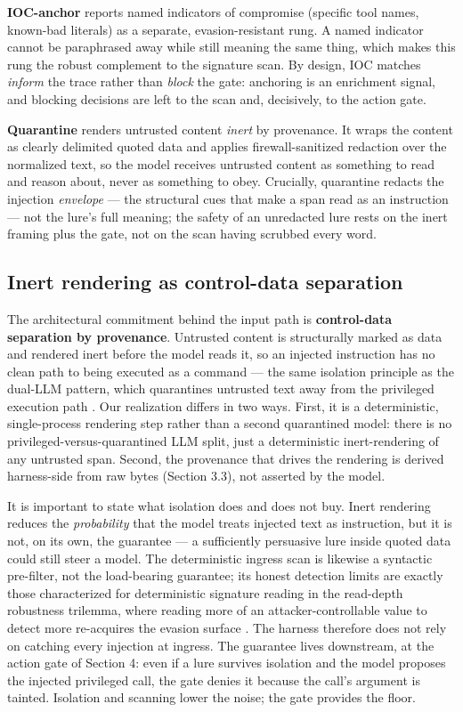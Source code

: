 \documentclass[sigconf,anonymous,review]{acmart}
\begin{document}
\textbf{IOC-anchor} reports named indicators of compromise (specific tool names, known-bad literals) as a separate, evasion-resistant rung. A named indicator cannot be paraphrased away while still meaning the same thing, which makes this rung the robust complement to the signature scan. By design, IOC matches \textit{inform} the trace rather than \textit{block} the gate: anchoring is an enrichment signal, and blocking decisions are left to the scan and, decisively, to the action gate.

\textbf{Quarantine} renders untrusted content \textit{inert} by provenance. It wraps the content as clearly delimited quoted data and applies firewall-sanitized redaction over the normalized text, so the model receives untrusted content as something to read and reason about, never as something to obey. Crucially, quarantine redacts the injection \textit{envelope} --- the structural cues that make a span read as an instruction --- not the lure's full meaning; the safety of an unredacted lure rests on the inert framing plus the gate, not on the scan having scrubbed every word.


\subsection{Inert rendering as control-data separation}
The architectural commitment behind the input path is \textbf{control-data separation by provenance}. Untrusted content is structurally marked as data and rendered inert before the model reads it, so an injected instruction has no clean path to being executed as a command --- the same isolation principle as the dual-LLM pattern, which quarantines untrusted text away from the privileged execution path \citep{willison-2023-dualllm}. Our realization differs in two ways. First, it is a deterministic, single-process rendering step rather than a second quarantined model: there is no privileged-versus-quarantined LLM split, just a deterministic inert-rendering of any untrusted span. Second, the provenance that drives the rendering is derived harness-side from raw bytes (Section 3.3), not asserted by the model.

It is important to state what isolation does and does not buy. Inert rendering reduces the \textit{probability} that the model treats injected text as instruction, but it is not, on its own, the guarantee --- a sufficiently persuasive lure inside quoted data could still steer a model. The deterministic ingress scan is likewise a syntactic pre-filter, not the load-bearing guarantee; its honest detection limits are exactly those characterized for deterministic signature reading in the read-depth robustness trilemma, where reading more of an attacker-controllable value to detect more re-acquires the evasion surface \citep{gmys-casiano-2026d}. The harness therefore does not rely on catching every injection at ingress. The guarantee lives downstream, at the action gate of Section 4: even if a lure survives isolation and the model proposes the injected privileged call, the gate denies it because the call's argument is tainted. Isolation and scanning lower the noise; the gate provides the floor.
\end{document}
